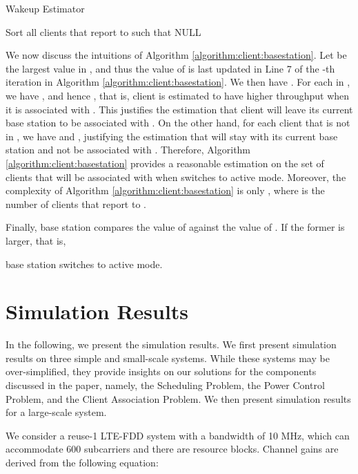 \documentclass[conference]{IEEEtran}
\begin{document}
\begin{algorithm}[t]
\caption{Wakeup Estimator} \label{algorithm:client:basestation}
\begin{algorithmic}[1]
\STATE Sort all clients that report to  such that 
\STATE  NULL
\STATE 
\FOR{}
\IF{}
\STATE 
\STATE 
\ENDIF
\ENDFOR
\RETURN 
\end{algorithmic}
\end{algorithm}


We now discuss the intuitions of Algorithm \ref{algorithm:client:basestation}. Let  be the largest value in , and thus the value of  is last updated in Line 7 of the -th iteration in Algorithm \ref{algorithm:client:basestation}. We then have . For each  in , we have , and hence , that is, client  is estimated to have higher throughput when it is associated with . This justifies the estimation that client  will leave its current base station to be associated with . On the other hand, for each client  that is not in , we have  and , justifying the estimation that  will stay with its current base station and not be associated with . Therefore, Algorithm \ref{algorithm:client:basestation} provides a reasonable estimation on the set of clients that will be associated with  when  switches to active mode. Moreover, the complexity of Algorithm \ref{algorithm:client:basestation} is only , where  is the number of clients that report to .

Finally, base station  compares the value of  against the value of . If the former is larger, that is,

base station  switches to active mode.


\section{Simulation Results}    \label{section:simulation}


In the following, we present the simulation results. We first present simulation results on three simple and small-scale systems. While these systems may be over-simplified, they provide insights on our solutions for the components discussed in the paper, namely, the Scheduling Problem, the Power Control Problem, and the Client Association Problem. We then present simulation results for a large-scale system.

We consider a reuse-1 LTE-FDD system with a bandwidth of 10 MHz, which can accommodate 600 subcarriers \cite{3GPP2010R10UE} and there are  resource blocks. Channel gains are derived from the following equation:
\end{document}
